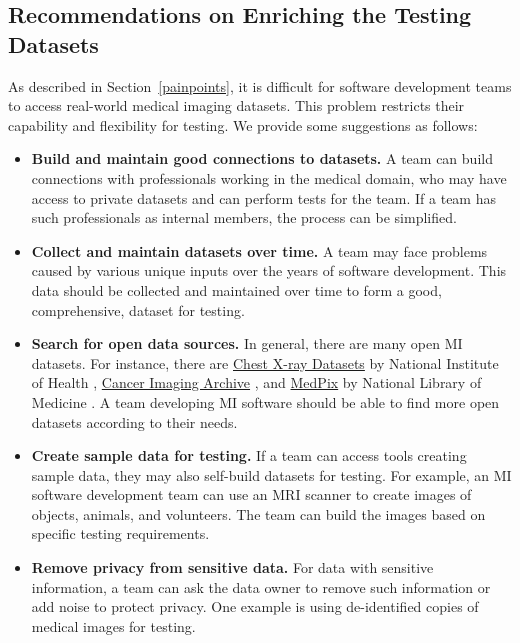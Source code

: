 \documentclass[final, 3p, times, authoryear]{elsarticle}
\begin{document}
\subsection{Recommendations on Enriching the Testing Datasets} 
\label{sec_recommendations_testing_dataset}

As described in Section~\ref{painpoints}, it is difficult for
software development teams to access real-world medical imaging datasets. This
problem restricts their capability and flexibility for testing. We provide some
suggestions as follows:

\begin{itemize}
\item \textbf{Build and maintain good connections to datasets.} A team can build
connections with professionals working in the medical domain, who may have
access to private datasets and can perform tests for the team. If a team has
such professionals as internal members, the process can be simplified.

\item \textbf{Collect and maintain datasets over time.} A team may face problems
caused by various unique inputs over the years of software development. This
data should be collected and maintained over time to form a good, comprehensive,
dataset for testing.

\item \textbf{Search for open data sources.} In general, there are many open MI
datasets.  For instance, there are
\href{https://nihcc.app.box.com/v/ChestXray-NIHCC}{Chest X-ray Datasets} by
National Institute of Health \citep{WangEtAl2017},
\href{https://www.cancerimagingarchive.net/}{Cancer Imaging Archive}
\citep{PriorEtAl2017}, and \href{https://medpix.nlm.nih.gov/home}{MedPix} by
National Library of Medicine \citep{Smirniotopoulos2014}. A team developing MI
software should be able to find more open datasets according to their needs.

\item \textbf{Create sample data for testing.} If a team can access tools
creating sample data, they may also self-build datasets for testing. For
example, an MI software development team can use an MRI scanner to create images
of objects, animals, and volunteers. The team can build the images based on
specific testing requirements.

\item \textbf{Remove privacy from sensitive data.} For data with sensitive
information, a team can ask the data owner to remove such information or add
noise to protect privacy. One example is using de-identified copies of medical
images for testing.


\end{itemize}
\end{document}

